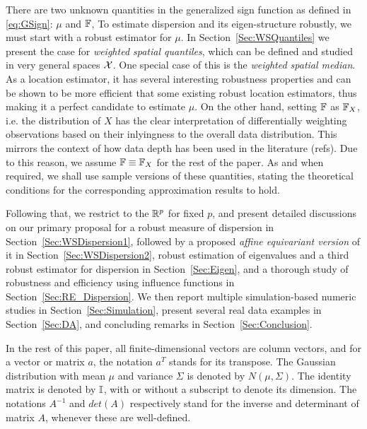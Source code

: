 There are two unknown quantities in the generalized sign function as defined in \eqref{eq:GSign}: $\mu$ and ${\mathbb{F}}$, To estimate dispersion and its eigen-structure robustly, we must start with a robust estimator for $\mu$. In Section~\ref{Sec:WSQuantiles} we present the case for \textit{weighted spatial quantiles}, which can be defined and studied in very general spaces 
$\mathcal{X}$. One special case of this is the {\it weighted spatial median}. As a location estimator, it has several interesting robustness properties and can be shown to be more efficient that some existing robust location estimators, thus making it a perfect candidate to estimate $\mu$. On the other hand, setting ${\mathbb{F}}$ as ${\mathbb{F}}_X$, i.e. the distribution of $X$ has the clear interpretation of differentially weighting observations based on their inlyingness to the overall data distribution. This mirrors the context of how data depth has been used in the literature (refs). Due to this reason, we assume ${\mathbb{F}} \equiv {\mathbb{F}}_X$ for the rest of the paper. As and when required, we shall use sample versions of these quantities, stating the theoretical conditions for the corresponding approximation results to hold.

Following that, we restrict to the ${\mathbb{R}}^{p}$ for fixed $p$, and present detailed 
discussions on our primary proposal for a  robust measure of dispersion in 
Section~\ref{Sec:WSDispersion1}, followed by a proposed 
\textit{ affine equivariant version} of 
it in Section~\ref{Sec:WSDispersion2}, robust estimation of eigenvalues and a third 
robust estimator for dispersion in Section~\ref{Sec:Eigen}, and a thorough study of 
robustness and efficiency using influence functions in Section~\ref{Sec:RE_Dispersion}.
We then report multiple simulation-based numeric studies in Section~\ref{Sec:Simulation}, 
present several real data examples in Section~\ref{Sec:DA}, and concluding remarks in 
Section~\ref{Sec:Conclusion}.

In the rest of this paper, all finite-dimensional vectors are 
column vectors, and for a vector or matrix $a$, the notation $a^{T}$ stands for 
its transpose. The Gaussian distribution with mean $\mu$ and variance $\Sigma$ is denoted
by $N (\mu, \Sigma)$. The identity matrix  is denoted by ${\mathbb{I}}$, with or without a 
subscript to denote its dimension. The notations $A^{-1}$ and $det (A)$ respectively 
stand for the inverse and determinant of matrix $A$, whenever these are well-defined.

